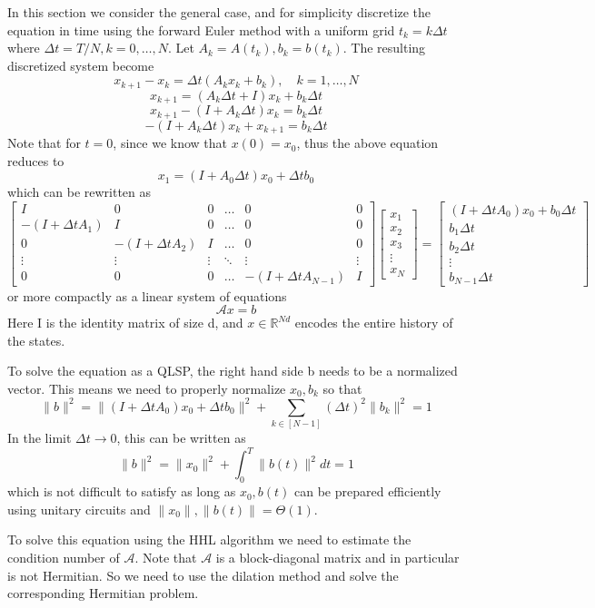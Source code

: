 \documentclass[12pt, oneside]{book}
\theoremstyle{definition}
\theoremstyle{definition}
\theoremstyle{remark}
\begin{document}
In this section we consider the general case, and for simplicity discretize the equation in time using  the forward Euler method with a uniform grid $t_k=k\Delta t$ where $\Delta t=T/N,k=0,\ldots, N$. Let $A_k=A(t_k),b_k=b(t_k)$. The resulting discretized system become
\[
x_{k+1}-x_k=\Delta t(A_kx_k+b_k), \quad k=1,\ldots,N
\]
\[
x_{k+1}=(A_k\Delta t + I)x_k+b_k\Delta t
\]
\[
x_{k+1}-(I + A_k\Delta t)x_k=b_k\Delta t
\]
\[
-(I+A_k\Delta t)x_k+x_{k+1}=b_k\Delta t
\]
Note that for $t=0$, since we know that $x(0)=x_0$, thus the above equation reduces to
\[
x_1=(I+A_0\Delta t)x_0+\Delta tb_0
\]
which can be rewritten as
\[\begin{bmatrix} I & 0 & 0 & \ldots & 0 & 0 \\
-(I+\Delta tA_1) & I & 0 & \ldots &0 & 0\\
0 & -(I+\Delta tA_2) & I & \ldots & 0 & 0 \\
\vdots & \vdots & \vdots & \ddots & \vdots & \vdots \\
0 & 0 & 0 & \ldots & -(I+\Delta tA_{N-1}) & I \end{bmatrix}
\begin{bmatrix} x_1 \\x_2 \\x_3 \\ \vdots \\ x_N \end{bmatrix} =
\begin{bmatrix} (I+\Delta t A_0)x_0+b_0\Delta t \\ b_1\Delta t\\b_2\Delta t\\ \vdots \\ b_{N-1}\Delta t \end{bmatrix}
\]
or more compactly as a linear system of equations
\[
\mathcal{A}x=b
\]
Here I is the identity matrix of size d, and $x \in \mathbb{R}^{Nd}$
encodes the entire history of the states.

To solve the equation as a QLSP, the right hand side b needs to be a normalized vector. This means we need to properly normalize $x_0,b_k$ so that
\[
\|b\|^2=\|(I+\Delta tA_0)x_0+\Delta tb_0\|^2+\sum_{k \in [N-1]} (\Delta t)^2\|b_k\|^2=1
\]
In the limit $\Delta t\rightarrow 0$, this can be written as
\[\|b\|^2=\|x_0\|^2+\int_0^T \|b(t)\|^2 dt=1\]
which is not difficult to satisfy as long as $x_0,b(t)$ can be prepared efficiently using unitary circuits and $\|x_0\|,\|b(t)\|=\Theta(1)$.

To solve this equation using the HHL algorithm we need to estimate the condition number of $\mathcal{A}$. Note that $\mathcal{A}$ is a block-diagonal matrix and in particular is not Hermitian. So we need to use the dilation method and solve the corresponding Hermitian problem.
\end{document}
